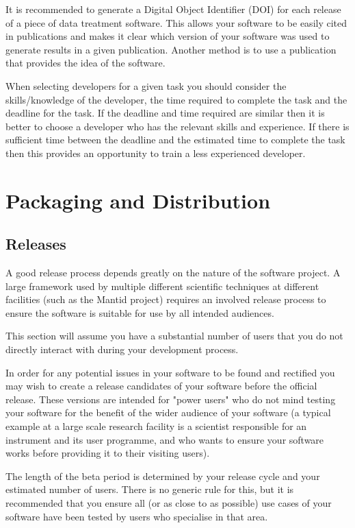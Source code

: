\documentclass[jnr]{iosart2x}
\begin{document}
It is recommended to generate a Digital Object Identifier (DOI) for each release of a piece of data treatment software.
This allows your software to be easily cited in publications and makes it clear which version of your software was used to generate results in a given publication.
Another method is to use a publication that provides the idea of the software.

When selecting developers for a given task you should consider the skills/knowledge of the developer, the time required to complete the task and the deadline for the task.
If the deadline and time required are similar then it is better to choose a developer who has the relevant skills and experience.
If there is sufficient time between the deadline and the estimated time to complete the task then this provides an opportunity to train a less experienced developer.

\section{Packaging and Distribution}
\label{Packaging and Distribution}

\subsection{Releases}
\label{Releases}

A good release process depends greatly on the nature of the software project.
A large framework used by multiple different scientific techniques at different facilities (such as the Mantid project) requires an involved release process to ensure the software is suitable for use by all intended audiences.

This section will assume you have a substantial number of users that you do not directly interact with during your development process.

In order for any potential issues in your software to be found and rectified you may wish to create a release candidates of your software before the official release.
These versions are intended for "power users" who do not mind testing your software for the benefit of the wider audience of your software (a typical example at a large scale research facility is a scientist responsible for an instrument and its user programme, and who wants to ensure your software works before providing it to their visiting users).

The length of the beta period is determined by your release cycle and your estimated number of users.
There is no generic rule for this, but it is recommended that you ensure all (or as close to as possible) use cases of your software have been tested by users who specialise in that area.
\end{document}
